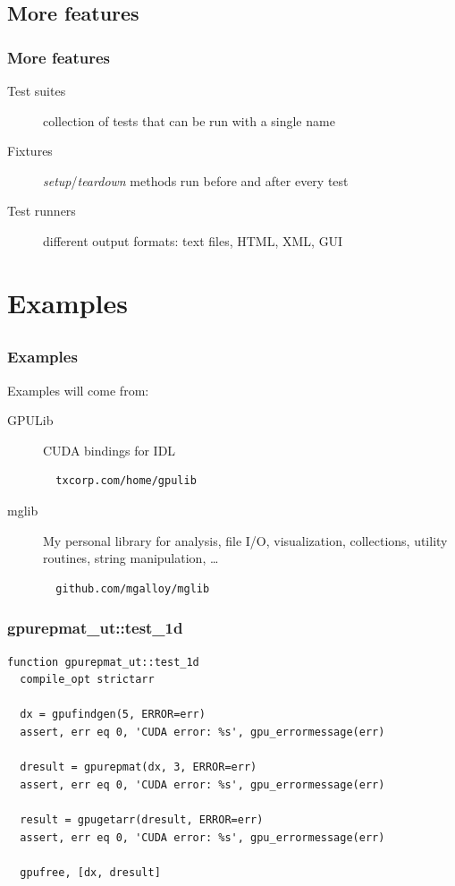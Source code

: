 \documentclass[12pt, handout]{beamer}
\begin{document}
\subsection{More features}

\begin{frame}[t, fragile]
  \frametitle{More features}
  \begin{description}
    \item[Test suites] collection of tests that can be run with a single name
    \item[Fixtures] {\em setup}/{\em teardown} methods run before and after every test
    \item[Test runners] different output formats: text files, HTML, XML, GUI
  \end{description}
\end{frame}


\section{Examples}
\subsection*{}

\begin{frame}[t, fragile]
  \hypertarget{examples}{}
  \frametitle{Examples}
  Examples will come from:

  \begin{description}
    \item[GPULib] CUDA bindings for IDL
\begin{lstlisting}
  txcorp.com/home/gpulib
\end{lstlisting}
\hyperlink{gpulib}{}

    \item[mglib] My personal library for analysis, file I/O, visualization, collections, utility routines, string manipulation, \ldots
\begin{lstlisting}
  github.com/mgalloy/mglib
\end{lstlisting}
  \end{description}
\end{frame}

\begin{frame}[t, fragile]
  \frametitle{gpurepmat\_ut::test\_1d}

\begin{lstlisting}[basicstyle=\ttfamily\fontsize{8pt}{8pt}\selectfont]
function gpurepmat_ut::test_1d
  compile_opt strictarr

  dx = gpufindgen(5, ERROR=err)
  assert, err eq 0, 'CUDA error: %s', gpu_errormessage(err)

  dresult = gpurepmat(dx, 3, ERROR=err)
  assert, err eq 0, 'CUDA error: %s', gpu_errormessage(err)

  result = gpugetarr(dresult, ERROR=err)
  assert, err eq 0, 'CUDA error: %s', gpu_errormessage(err)

  gpufree, [dx, dresult]
\end{lstlisting}
\end{frame}
\end{document}
